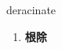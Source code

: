 
\begin{frame}
{\huge deracinate}
\begin{center}
\begin{enumerate}\Large
  \item \textbf{根除}
\end{enumerate}
\end{center}
\end{frame}
